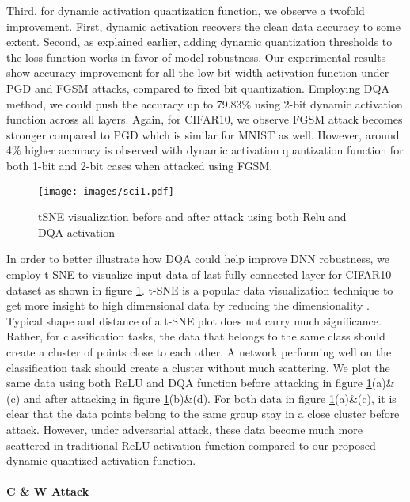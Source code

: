 \documentclass{article}
\begin{document}
Third, for dynamic activation quantization function, we observe a twofold improvement. First, dynamic activation recovers the clean data accuracy to some extent. Second, as explained earlier, adding dynamic quantization thresholds to the loss function works in favor of model robustness. Our experimental results show accuracy improvement for all the low bit width activation function under PGD and FGSM attacks, compared to fixed bit quantization. Employing DQA method, we could push the accuracy up to 79.83\% using 2-bit dynamic activation function across all layers. Again, for CIFAR10, we observe FGSM attack becomes stronger compared to PGD which is similar for MNIST as well. However, around 4\% higher accuracy is observed with dynamic activation quantization function for both 1-bit and 2-bit cases when attacked using FGSM. 


\begin{figure}[ht]
  \centering
   \texttt{[image: images/sci1.pdf]}
   \caption{tSNE visualization before and after attack using both Relu and DQA activation}
   \label{tsne}
\end{figure}


In order to better illustrate how DQA could help improve DNN robustness, we employ t-SNE to visualize input data of last fully connected layer for CIFAR10 dataset as shown in figure \ref{tsne}. t-SNE is a popular data visualization technique to get more insight to high dimensional data by reducing the dimensionality \cite{maaten2008visualizing}. Typical shape and distance of a t-SNE plot does not carry much significance. Rather, for classification tasks, the data that belongs to the same class should create a cluster of points close to each other. A network performing well on the classification task should create a cluster without much scattering. We plot the same data using both ReLU and DQA function before attacking in figure \ref{tsne}(a)\&(c) and after attacking in figure \ref{tsne}(b)\&(d). For both data in figure \ref{tsne}(a)\&(c), it is clear that the data points belong to the same group stay in a close cluster before attack. However, under adversarial attack, these data become much more scattered in traditional ReLU activation function compared to our proposed dynamic quantized activation function.

\paragraph{C \& W Attack}
 
\end{document}
